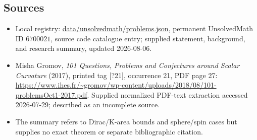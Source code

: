 \documentclass[11pt]{article}
\begin{document}
\subsection{Sources}
\begin{itemize}
\item Local registry: \url{data/unsolvedmath/problems.json}, permanent UnsolvedMath ID \(6700021\), source code catalogue entry; supplied statement, background, and research summary, updated 2026-08-06.
\item Misha Gromov, \emph{101 Questions, Problems and Conjectures around Scalar Curvature} (2017), printed tag [?21], occurrence 21, PDF page 27: \url{https://www.ihes.fr/~gromov/wp-content/uploads/2018/08/101-problemsOct1-2017.pdf}. Supplied normalized PDF-text extraction accessed 2026-07-29; described as an incomplete source.
\item The summary refers to Dirac/K-area bounds and sphere/spin cases but supplies no exact theorem or separate bibliographic citation.
\end{itemize}
\end{document}
